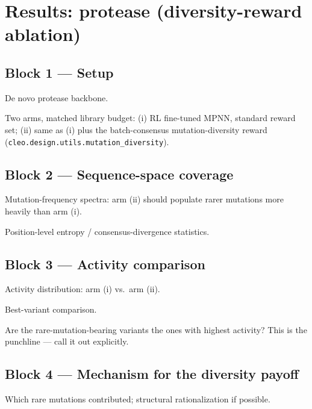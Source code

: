 \section{Results: protease (diversity-reward ablation)}
\label{sec:res:protease}


\subsection*{Block 1 --- Setup}
\begin{planlist}
  \item De novo protease backbone.
  \item Two arms, matched library budget: (i) RL fine-tuned MPNN, standard
        reward set; (ii) same as (i) plus the batch-consensus
        mutation-diversity reward
        (\texttt{cleo.design.utils.mutation\_diversity}).
\end{planlist}

\subsection*{Block 2 --- Sequence-space coverage}
\begin{planlist}
  \item Mutation-frequency spectra: arm (ii) should populate rarer mutations
        more heavily than arm (i).
  \item Position-level entropy / consensus-divergence statistics.
\end{planlist}

\subsection*{Block 3 --- Activity comparison}
\begin{planlist}
  \item Activity distribution: arm (i) vs.\ arm (ii).
  \item Best-variant comparison.
  \item Are the rare-mutation-bearing variants the ones with highest activity?
        This is the punchline --- call it out explicitly.
\end{planlist}

\subsection*{Block 4 --- Mechanism for the diversity payoff}
\begin{planlist}
  \item Which rare mutations contributed; structural rationalization if
        possible.
\end{planlist}
